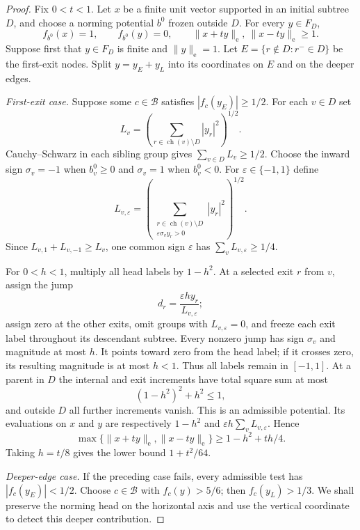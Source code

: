 \begin{proof}
Fix $0<t<1$.  Let $x$ be a finite unit vector supported in an initial
subtree $D$, and choose a norming potential $b^0$ frozen outside $D$.
For every $y\in F_D$,
\begin{equation}
 f_{b^0}(x)=1,\qquad f_{b^0}(y)=0,
 \qquad \|x+ty\|_{\mathrm e},\ \|x-ty\|_{\mathrm e}\ge1.
 \label{fr:two-lower-bounds}
\end{equation}
Suppose first that $y\in F_D$ is finite and $\|y\|_{\mathrm e}=1$.
Let $E=\{r\notin D:r^-\in D\}$ be the first-exit nodes.  Split
$y=y_E+y_L$ into its coordinates on $E$ and on the deeper edges.

\emph{First-exit case.}
Suppose some $c\in\mathcal B$ satisfies $|f_c(y_E)|\ge1/2$.
For each $v\in D$ set
\[
 L_v=\left(\sum_{r\in\operatorname{ch}(v)\setminus D}|y_r|^2\right)^{1/2}.
\]
Cauchy--Schwarz in each sibling group gives $\sum_{v\in D}L_v\ge1/2$.
Choose the inward sign $\sigma_v=-1$ when $b^0_v\ge0$ and
$\sigma_v=1$ when $b^0_v<0$.  For $\varepsilon\in\{-1,1\}$ define
\[
 L_{v,\varepsilon}=
 \left(\sum_{\substack{r\in\operatorname{ch}(v)\setminus D\\
                     \varepsilon\sigma_v y_r>0}}|y_r|^2\right)^{1/2}.
\]
Since $L_{v,1}+L_{v,-1}\ge L_v$, one common sign $\varepsilon$ has
$\sum_vL_{v,\varepsilon}\ge1/4$.

For $0<h<1$, multiply all head labels by $1-h^2$.  At a selected exit
$r$ from $v$, assign the jump
\[
 d_r=\frac{\varepsilon h y_r}{L_{v,\varepsilon}};
\]
assign zero at the other exits, omit groups with
$L_{v,\varepsilon}=0$, and freeze each exit label throughout its
descendant subtree.  Every nonzero jump has sign $\sigma_v$ and
magnitude at most $h$.  It points toward zero from the head label;
if it crosses zero, its resulting magnitude is at most $h<1$.
Thus all labels remain in $[-1,1]$.  At a parent in $D$ the internal
and exit increments have total square sum at most
\[
 (1-h^2)^2+h^2\le1,
\]
and outside $D$ all further increments vanish.  This is an admissible
potential.  Its evaluations on $x$ and $y$ are respectively $1-h^2$
and $\varepsilon h\sum_vL_{v,\varepsilon}$.  Hence
\begin{equation}
 \max\{\|x+ty\|_{\mathrm e},\|x-ty\|_{\mathrm e}\}
 \ge1-h^2+th/4.
 \label{fr:exit}
\end{equation}
Taking $h=t/8$ gives the lower bound $1+t^2/64$.

\emph{Deeper-edge case.}
If the preceding case fails, every admissible test has
$|f_c(y_E)|<1/2$.  Choose $c\in\mathcal B$ with $f_c(y)>5/6$;
then $f_c(y_L)>1/3$.  We shall preserve the norming head on the
horizontal axis and use the vertical coordinate to detect this deeper
contribution.


\end{proof}

